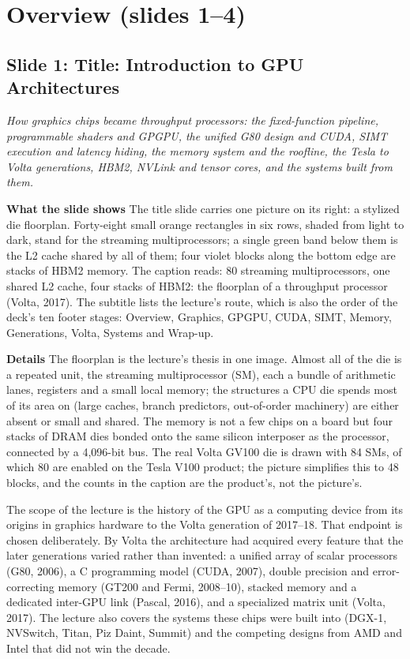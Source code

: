 \documentclass[11pt,letterpaper]{article}
\newcommand{\slide}[3]{%
  \subsection[Slide #1: #2]{Slide #1: #2}%
  {\color{muted}\itshape #3\par}\medskip}
\newcommand{\para}[1]{\medskip\noindent\textbf{#1}\quad}
\begin{document}
\section{Overview (slides 1--4)}

\slide{1}{Title: Introduction to GPU Architectures}{How graphics chips became throughput processors: the fixed-function pipeline, programmable shaders and GPGPU, the unified G80 design and CUDA, SIMT execution and latency hiding, the memory system and the roofline, the Tesla to Volta generations, HBM2, NVLink and tensor cores, and the systems built from them.}

\para{What the slide shows} The title slide carries one picture on its right: a stylized die floorplan. Forty-eight small orange rectangles in six rows, shaded from light to dark, stand for the streaming multiprocessors; a single green band below them is the L2 cache shared by all of them; four violet blocks along the bottom edge are stacks of HBM2 memory. The caption reads: 80 streaming multiprocessors, one shared L2 cache, four stacks of HBM2: the floorplan of a throughput processor (Volta, 2017). The subtitle lists the lecture's route, which is also the order of the deck's ten footer stages: Overview, Graphics, GPGPU, CUDA, SIMT, Memory, Generations, Volta, Systems and Wrap-up.

\para{Details} The floorplan is the lecture's thesis in one image. Almost all of the die is a repeated unit, the streaming multiprocessor (SM), each a bundle of arithmetic lanes, registers and a small local memory; the structures a CPU die spends most of its area on (large caches, branch predictors, out-of-order machinery) are either absent or small and shared. The memory is not a few chips on a board but four stacks of DRAM dies bonded onto the same silicon interposer as the processor, connected by a 4{,}096-bit bus. The real Volta GV100 die is drawn with 84 SMs, of which 80 are enabled on the Tesla V100 product; the picture simplifies this to 48 blocks, and the counts in the caption are the product's, not the picture's.

The scope of the lecture is the history of the GPU as a computing device from its origins in graphics hardware to the Volta generation of 2017--18. That endpoint is chosen deliberately. By Volta the architecture had acquired every feature that the later generations varied rather than invented: a unified array of scalar processors (G80, 2006), a C programming model (CUDA, 2007), double precision and error-correcting memory (GT200 and Fermi, 2008--10), stacked memory and a dedicated inter-GPU link (Pascal, 2016), and a specialized matrix unit (Volta, 2017). The lecture also covers the systems these chips were built into (DGX-1, NVSwitch, Titan, Piz Daint, Summit) and the competing designs from AMD and Intel that did not win the decade.
\end{document}
